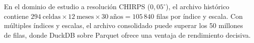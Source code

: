 \begin{example}
En el dominio de estudio a resolución CHIRPS ($0{,}05^{\circ}$), el archivo histórico contiene $294~\text{celdas} \times 12~\text{meses} \times 30~\text{años} = 105\,840$ filas por índice y escala. Con múltiples índices y escalas, el archivo consolidado puede superar los 50 millones de filas, donde DuckDB sobre Parquet ofrece una ventaja de rendimiento decisiva.
\end{example}
